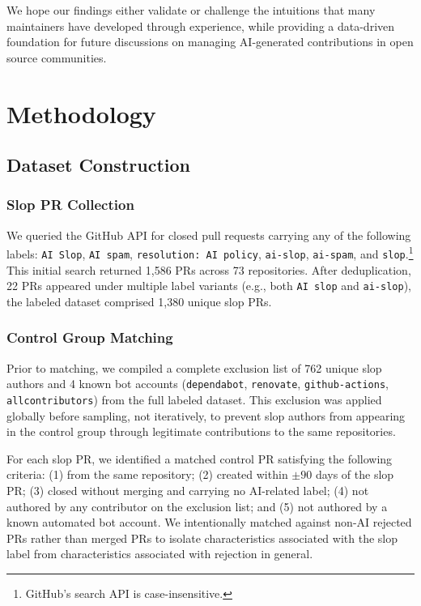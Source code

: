 \documentclass[11pt]{article}
\begin{document}
	We hope our findings either validate or challenge the intuitions that many maintainers have developed through experience, while providing a data-driven foundation for future discussions on managing AI-generated contributions in open source communities.
	
	\section{Methodology}
	\label{sec:methodology}
	
	\subsection{Dataset Construction}
	
	\subsubsection{Slop PR Collection}
	
	We queried the GitHub API for closed pull requests carrying any of the following labels: \texttt{AI Slop}, \texttt{AI spam}, \texttt{resolution: AI policy}, \texttt{ai-slop}, \texttt{ai-spam}, and \texttt{slop}.\footnote{GitHub's search API is case-insensitive.} This initial search returned 1,586 PRs across 73 repositories. After deduplication, 22 PRs appeared under multiple label variants (e.g., both \texttt{AI slop} and \texttt{ai-slop}), the labeled dataset comprised 1,380 unique slop PRs.
	
	\subsubsection{Control Group Matching}
	
	Prior to matching, we compiled a complete exclusion list of 762 unique slop authors and 4 known bot accounts (\texttt{dependabot}, \texttt{renovate}, \texttt{github-actions}, \texttt{allcontributors}) from the full labeled dataset. This exclusion was applied globally before sampling, not iteratively, to prevent slop authors from appearing in the control group through legitimate contributions to the same repositories.
	
	For each slop PR, we identified a matched control PR satisfying the following criteria: (1) from the same repository; (2) created within $\pm 90$ days of the slop PR; (3) closed without merging and carrying no AI-related label; (4) not authored by any contributor on the exclusion list; and (5) not authored by a known automated bot account. We intentionally matched against non-AI rejected PRs rather than merged PRs to isolate characteristics associated with the slop label from characteristics associated with rejection in general.
	
\end{document}
